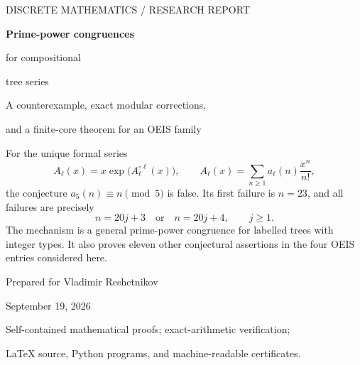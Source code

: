 \documentclass[11pt,letterpaper]{article}
\theoremstyle{definition}
\theoremstyle{remark}
\begin{document}
\begin{titlepage}
\vspace*{0.55in}
{\sffamily\color{Accent}\large DISCRETE MATHEMATICS \quad / \quad RESEARCH REPORT\par}
\vspace{0.35in}
{\sffamily\bfseries\color{Ink}\Huge Prime-power congruences\par
\vspace{0.12in}for compositional\par
\vspace{0.12in}tree series\par}
\vspace{0.4in}
{\Large A counterexample, exact modular corrections,\par
and a finite-core theorem for an OEIS family\par}
\vspace{0.45in}
\begin{resultbox}
For the unique formal series
\[
 A_\ell(x)=x\exp\!\bigl(A_\ell^{\circ\ell}(x)\bigr),\qquad
 A_\ell(x)=\sum_{n\ge1}a_\ell(n)\frac{x^n}{n!},
\]
the conjecture $a_5(n)\equiv n\pmod5$ is false. Its first failure is
$n=23$, and all failures are precisely
\[
 n=20j+3\quad\text{or}\quad n=20j+4,\qquad j\ge1.
\]
The mechanism is a general prime-power congruence for labelled trees with
integer types. It also proves eleven other conjectural assertions in the
four OEIS entries considered here.
\end{resultbox}
\vfill
{\large Prepared for Vladimir Reshetnikov\par}
{\large September 19, 2026\par}
\vspace{0.15in}
{\small Self-contained mathematical proofs; exact-arithmetic verification;\par
LaTeX source, Python programs, and machine-readable certificates.\par}
\end{titlepage}
\end{document}
